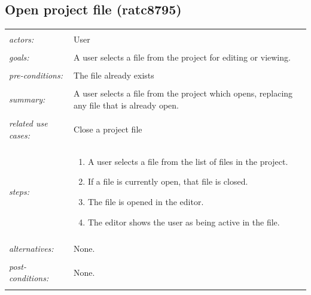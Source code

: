 \documentclass[11pt]{report}
\begin{document}
\begin{IDE-like Features}
\begin{}
\begin{Collaborative features that would be "nice":}
\subsection{Open project file (ratc8795)}
\begin{tabular}{ p{2cm} p{12cm} }
 \hline
 \\
 \textit{actors:} & User \\ 
 \\
 \textit{goals:} & A user selects a file from the project for editing or viewing. \\
 \\
 \textit{pre-conditions:} & The file already exists \\
 \\
 \textit{summary:} & A user selects a file from the project which opens, replacing any file that is already open. \\ 
 \\
 \textit{related use cases:} & Close a project file \\ 
 \\
 \textit{steps:} & \begin{enumerate}
  \item A user selects a file from the list of files in the project.
  \item If a file is currently open, that file is closed.
  \item The file is opened in the editor.
  \item The editor shows the user as being active in the file.
 \end{enumerate} \\
 \\
 \textit{alternatives:} & None. \\
 \\
 \textit{post-conditions:} & None. \\
 \\
\hline
\end{tabular}


\end{Collaborative features that would be "nice":}
\end{}
\end{IDE-like Features}
\end{document}
